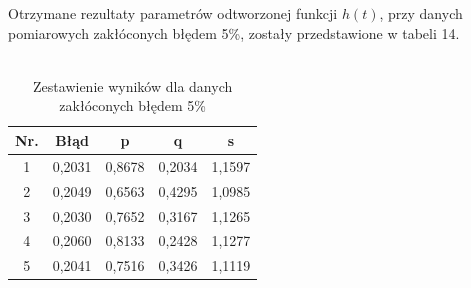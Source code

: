 \documentclass[twoside]{projektInzynierskiMS1}
\newcounter{rowcnt}
\newcommand\rownum{\ifnumequal{\value{rowcnt}}{0}{\textbf{Nr.}}{\therowcnt.}\refstepcounter{rowcnt}}
\begin{document}



Otrzymane rezultaty parametrów odtworzonej funkcji $h(t)$, przy danych pomiarowych zakłóconych błędem 5\%, zostały przedstawione w tabeli 14. \\\

\begin{table}[htbp]\centering
\def\sym#1{\ifmmode^{#1}\else\(^{#1}\)\fi}
\caption{Zestawienie wyników dla danych zakłóconych błędem 5\%}
\renewcommand\arraystretch{1.333}
\begin{tabular}{|c|c|c|c|c|} 
                  \hline
\textbf{Nr.}& \textbf{Błąd} &\textbf{p} & \textbf{q} & \textbf{s}\\ \hline
1& 0,2031 & 0,8678 & 0,2034 & 1,1597 \\ \hline 
2& 0,2049 & 0,6563 & 0,4295 & 1,0985 \\ \hline 
3& 0,2030 & 0,7652 & 0,3167 & 1,1265 \\ \hline 
4& 0,2060 & 0,8133 & 0,2428 & 1,1277 \\ \hline 
5& 0,2041 & 0,7516 & 0,3426 & 1,1119 \\ \hline 
\end{tabular}
\end{table}
\end{document}
